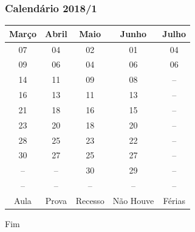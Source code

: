 \documentclass{beamer}
\begin{document}
\begin{frame}
\frametitle{Calendário 2018/1}
\begin{table}
\begin{tabular}{c c c c c}
\toprule
\textbf{Março} & \textbf{Abril} & \textbf{Maio} & \textbf{Junho} & \textbf{Julho}\\
\midrule
\cellcolor{green}07  & \cellcolor{green}04   & \cellcolor{green}02   & \cellcolor{cyan}01  & \cellcolor{magenta}04 \\
\cellcolor{yellow}09 & \cellcolor{green}06   & \cellcolor{green}04   & \cellcolor{green}06 & \cellcolor{magenta}06 \\
\cellcolor{green}14  & \cellcolor{magenta}11 & \cellcolor{green}09   & \cellcolor{green}08 & \cellcolor{gray}-- \\
\cellcolor{green}16  & \cellcolor{green}13   & \cellcolor{green}11   & \cellcolor{green}13 & \cellcolor{gray}-- \\
\cellcolor{green}21  & \cellcolor{green}18   & \cellcolor{green}16   & \cellcolor{green}15 & \cellcolor{gray}-- \\
\cellcolor{green}23  & \cellcolor{green}20   & \cellcolor{yellow}18  & \cellcolor{green}20 & \cellcolor{gray}-- \\
\cellcolor{green}28  & \cellcolor{green}25   & \cellcolor{magenta}23 & \cellcolor{green}22 & \cellcolor{gray}-- \\
\cellcolor{cyan}30   & \cellcolor{green}27   & \cellcolor{yellow}25  & \cellcolor{green}27 & \cellcolor{gray}-- \\
\cellcolor{white}--  & \cellcolor{white}--   & \cellcolor{green}30   & \cellcolor{green}29 & \cellcolor{gray}-- \\
\cellcolor{white}--  & \cellcolor{white}--   & \cellcolor{white}--   & \cellcolor{white}-- & \cellcolor{gray}-- \\
\bottomrule
\cellcolor{green}Aula & \cellcolor{magenta}Prova & \cellcolor{cyan}Recesso & \cellcolor{yellow}Não Houve & \cellcolor{gray}Férias\\
\end{tabular}
\end{table}
\end{frame}


\begin{frame}
\Huge{\centerline{Fim}}
\end{frame}

\end{document}
